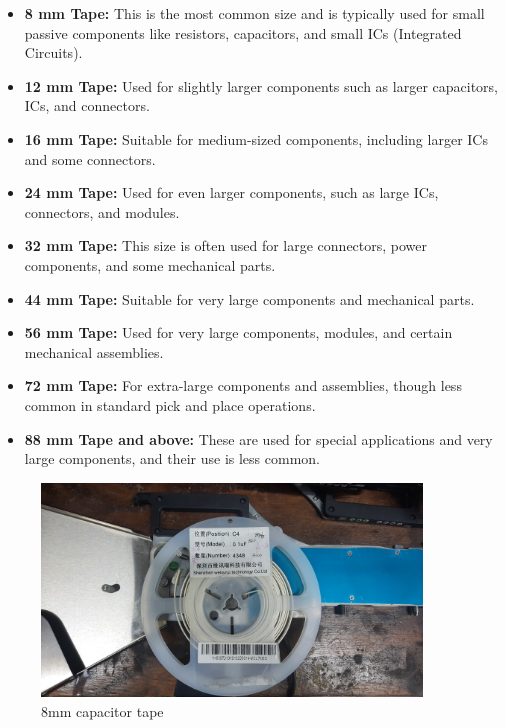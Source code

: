 \documentclass[a4paper,10pt]{report}
\begin{document}
\begin{itemize}
    \item \textbf{8 mm Tape:} This is the most common size and is typically used for small passive components like resistors, capacitors, and small ICs (Integrated Circuits).
    \item \textbf{12 mm Tape:} Used for slightly larger components such as larger capacitors, ICs, and connectors.
    \item \textbf{16 mm Tape:} Suitable for medium-sized components, including larger ICs and some connectors.
    \item \textbf{24 mm Tape:} Used for even larger components, such as large ICs, connectors, and modules.
    \item \textbf{32 mm Tape:} This size is often used for large connectors, power components, and some mechanical parts.
    \item \textbf{44 mm Tape:} Suitable for very large components and mechanical parts.
    \item \textbf{56 mm Tape:} Used for very large components, modules, and certain mechanical assemblies.
    \item \textbf{72 mm Tape:} For extra-large components and assemblies, though less common in standard pick and place operations.
    \item \textbf{88 mm Tape and above:} These are used for special applications and very large components, and their use is less common.
\end{itemize}
\begin{figure}[!htb]
 \centering
 \includegraphics[width=0.9\textwidth]{step1.jpg}
 \caption{8mm capacitor tape}
\end{figure}
\newpage
\end{document}
